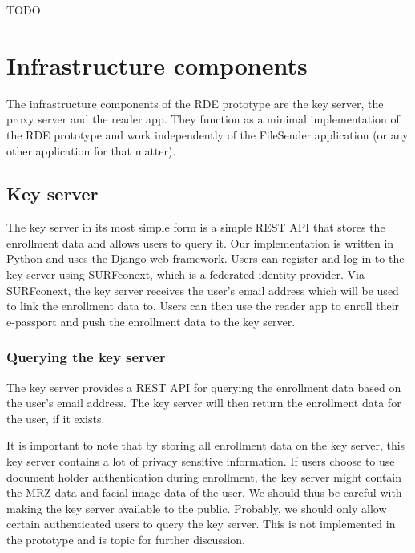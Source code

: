 TODO

\section{Infrastructure components}\label{sec:infrastructure-components}
The infrastructure components of the RDE prototype are the key server, the proxy server and the reader app.
They function as a minimal implementation of the RDE prototype and work independently of the FileSender application (or any other application for that matter).

\subsection{Key server}\label{subsec:key-server}
The key server in its most simple form is a simple REST API that stores the enrollment data and allows users to query it.
Our implementation is written in Python and uses the Django web framework.
Users can register and log in to the key server using SURFconext, which is a federated identity provider.
Via SURFconext, the key server receives the user's email address which will be used to link the enrollment data to.
Users can then use the reader app to enroll their e-passport and push the enrollment data to the key server.

\subsubsection{Querying the key server}\label{subsubsec:querying-the-key-server}
The key server provides a REST API for querying the enrollment data based on the user's email address.
The key server will then return the enrollment data for the user, if it exists.

It is important to note that by storing all enrollment data on the key server, this key server contains a lot of privacy sensitive information.
If users choose to use document holder authentication during enrollment, the key server might contain the MRZ data and facial image data of the user.
We should thus be careful with making the key server available to the public.
Probably, we should only allow certain authenticated users to query the key server.
This is not implemented in the prototype and is topic for further discussion.

